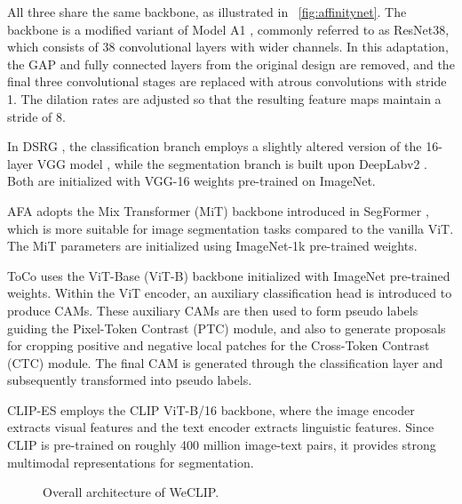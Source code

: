 All three share the same backbone, as illustrated in ~\autoref{fig:affinitynet}. The backbone is a modified variant of Model A1 \cite{RevisitingResNET}, commonly referred to as ResNet38, which consists of 38 convolutional layers with wider channels. In this adaptation, the GAP and fully connected layers from the original design are removed, and the final three convolutional stages are replaced with atrous convolutions with stride 1. The dilation rates are adjusted so that the resulting feature maps maintain a stride of 8.

In DSRG \cite{wsss_dsrg_deep_seeded_region_growing}, the classification branch employs a slightly altered version of the 16-layer VGG model \cite{VGG16}, while the segmentation branch is built upon DeepLabv2 \cite{fsss_deeplabv2}. Both are initialized with VGG-16 weights pre-trained on ImageNet.

AFA \cite{wsss_afa_affinity_from_attention} adopts the Mix Transformer (MiT) backbone introduced in SegFormer \cite{fsss_segformer}, which is more suitable for image segmentation tasks compared to the vanilla ViT. The MiT parameters are initialized using ImageNet-1k pre-trained weights.

ToCo \cite{wsss_toco_token_contrast} uses the ViT-Base (ViT-B) backbone initialized with ImageNet pre-trained weights. Within the ViT encoder, an auxiliary classification head is introduced to produce CAMs. These auxiliary CAMs are then used to form pseudo labels guiding the Pixel-Token Contrast (PTC) module, and also to generate proposals for cropping positive and negative local patches for the Cross-Token Contrast (CTC) module. The final CAM is generated through the classification layer and subsequently transformed into pseudo labels.

CLIP-ES \cite{wsss_clip_es} employs the CLIP ViT-B/16 backbone, where the image encoder extracts visual features and the text encoder extracts linguistic features. Since CLIP is pre-trained on roughly 400 million image-text pairs, it provides strong multimodal representations for segmentation.

\begin{figure}[htbp]
    \centering
    \caption{Overall architecture of WeCLIP.}
    \label{fig:frozenclip}
\end{figure}

